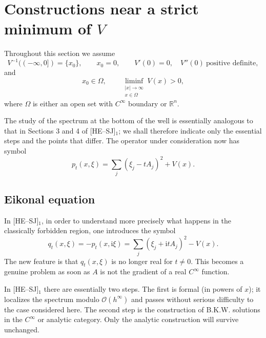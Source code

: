 \documentclass[11pt]{article}
\newcommand{\R}{\mathbb{R}}
\newcommand{\OO}{\mathcal O}
\newcommand{\ii}{\mathrm{i}}
\begin{document}
\section{Constructions near a strict minimum of $V$}

Throughout this section we assume
\begin{equation}
V^{-1}(( -\infty,0])=\{x_0\},\qquad x_0=0,
\qquad V'(0)=0,\quad V''(0)\ \text{positive definite},
\tag{2.1}
\end{equation}
and
\begin{equation}
x_0\in\Omega,
\qquad
\liminf_{\substack{|x|\to\infty\\x\in\Omega}}V(x)>0,
\tag{2.2}
\end{equation}
where $\Omega$ is either an open set with $C^\infty$ boundary or $\R^n$.

The study of the spectrum at the bottom of the well is essentially analogous to that in Sections 3 and 4 of [HE--SJ]$_1$; we shall therefore indicate only the essential steps and the points that differ.
The operator under consideration now has symbol
\begin{equation}
p_t(x,\xi)=\sum_j(\xi_j-tA_j)^2+V(x).
\tag{2.3}
\end{equation}

\subsection*{Eikonal equation}

In [HE--SJ]$_1$, in order to understand more precisely what happens in the classically forbidden region, one introduces the symbol
\begin{equation}
q_t(x,\xi)=-p_t(x,\ii\xi)
=\sum_j(\xi_j+\ii tA_j)^2-V(x).
\tag{2.4}
\end{equation}
The new feature is that $q_t(x,\xi)$ is no longer real for $t\ne0$. This becomes a genuine problem as soon as $A$ is not the gradient of a real $C^\infty$ function.

In [HE--SJ]$_1$ there are essentially two steps. The first is formal (in powers of $x$); it localizes the spectrum modulo $\OO(h^\infty)$ and passes without serious difficulty to the case considered here. The second step is the construction of B.K.W. solutions in the $C^\infty$ or analytic category. Only the analytic construction will survive unchanged.
\end{document}
